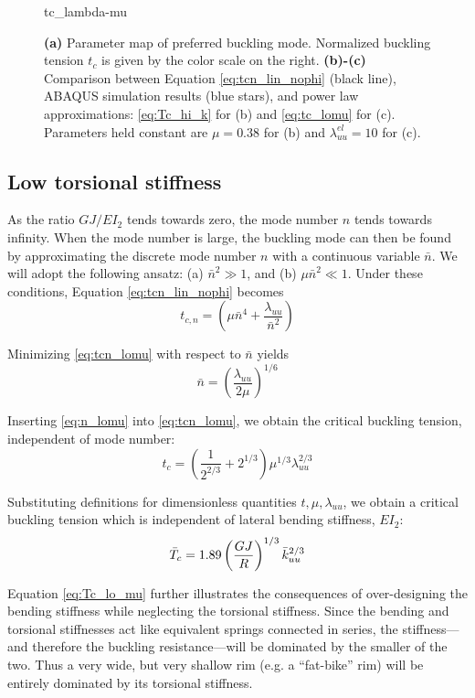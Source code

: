 \documentclass[\rootdir/thesis.tex]{subfiles}
\begin{document}
\begin{figure}[h]
\centering
{tc_lambda-mu}
\caption{\textbf{(a)} Parameter map of preferred buckling mode. Normalized buckling tension $t_c$ is given by the color scale on the right. \textbf{(b)-(c)} Comparison between Equation \eqref{eq:tcn_lin_nophi} (black line), ABAQUS simulation results (blue stars), and power law approximations: \eqref{eq:Tc_hi_k} for (b) and \eqref{eq:tc_lomu} for (c). Parameters held constant are $\mu=0.38$ for (b) and $\lambda_{uu}^{el}=10$ for (c).}
\label{fig:tc_lambda_mu}
\end{figure}

\subsection{Low torsional stiffness}
As the ratio $GJ/EI_2$ tends towards zero, the mode number $n$ tends towards infinity. When the mode number is large, the buckling mode can then be found by approximating the discrete mode number $n$ with a continuous variable $\bar{n}$. We will adopt the following ansatz: (a) $\bar{n}^2 \gg 1$, and (b) $\mu\bar{n}^2 \ll 1$. Under these conditions, Equation \eqref{eq:tcn_lin_nophi} becomes
\begin{equation}
\label{eq:tcn_lomu}
t_{c,n} = \left(\mu \bar{n}^4 + \frac{\lambda_{uu}}{\bar{n}^2}\right)
\end{equation}

Minimizing \eqref{eq:tcn_lomu} with respect to $\bar{n}$ yields
\begin{equation}
\label{eq:n_lomu}
\bar{n}=\left(\frac{\lambda_{uu}}{2\mu}\right)^{1/6}
\end{equation}

Inserting \eqref{eq:n_lomu} into \eqref{eq:tcn_lomu}, we obtain the critical buckling tension, independent of mode number:
\begin{equation}
\label{eq:tc_lomu}
t_c = \left(\frac{1}{2^{2/3}} + 2^{1/3}\right)\mu^{1/3}\lambda_{uu}^{2/3}
\end{equation}

Substituting definitions for dimensionless quantities $t,\mu,\lambda_{uu}$, we obtain a critical buckling tension which is independent of lateral bending stiffness, $EI_2$:
\begin{equation}
\label{eq:Tc_lo_mu}
\bar{T}_c = 1.89 \left( \frac{GJ}{R} \right)^{1/3} \bar{k}_{uu}^{2/3}
\end{equation}

Equation \eqref{eq:Tc_lo_mu} further illustrates the consequences of over-designing the bending stiffness while neglecting the torsional stiffness. Since the bending and torsional stiffnesses act like equivalent springs connected in series, the stiffness---and therefore the buckling resistance---will be dominated by the smaller of the two. Thus a very wide, but very shallow rim (e.g. a ``fat-bike'' rim) will be entirely dominated by its torsional stiffness.
\end{document}
